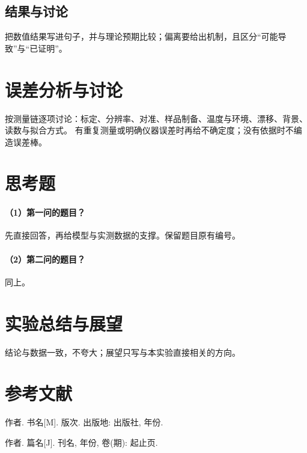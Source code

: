 \documentclass[UTF8,zihao=5,a4paper]{ctexart}
\begin{document}
\subsection{结果与讨论}
把数值结果写进句子，并与理论预期比较；偏离要给出机制，且区分“可能导致”与“已证明”。

\section{误差分析与讨论}
按测量链逐项讨论：标定、分辨率、对准、样品制备、温度与环境、漂移、背景、读数与拟合方式。
有重复测量或明确仪器误差时再给不确定度；没有依据时不编造误差棒。

\section{思考题}
\paragraph{（1）第一问的题目？}
先直接回答，再给模型与实测数据的支撑。保留题目原有编号。

\paragraph{（2）第二问的题目？}
同上。

\section{实验总结与展望}
结论与数据一致，不夸大；展望只写与本实验直接相关的方向。

\section{参考文献}
{
\begin{enumerate}[label={[\arabic*]},leftmargin=2.2em,itemsep=0.25em]
\item 作者. 书名[M]. 版次. 出版地: 出版社, 年份.
\item 作者. 篇名[J]. 刊名, 年份, 卷(期): 起止页.
\end{enumerate}
\par}
\end{document}
